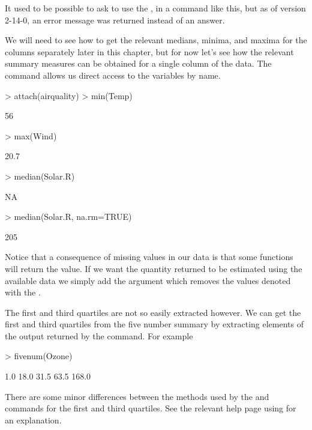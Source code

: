 It used to be possible to ask \R{} to use the , in a command like this, but as of version 2-14-0, an error message was returned instead of an answer. 
 
We will need to see how to get the relevant medians, minima, and maxima for the columns separately later in this chapter, but for now let's see how the relevant summary measures can be obtained for a single column of the  data. The  command allows us direct access to the variables by name. 
\begin{Schunk}
\begin{Sinput}
> attach(airquality) 
> min(Temp) 
\end{Sinput}
\begin{Soutput}
[1] 56
\end{Soutput}
\begin{Sinput}
> max(Wind) 
\end{Sinput}
\begin{Soutput}
[1] 20.7
\end{Soutput}
\begin{Sinput}
> median(Solar.R) 
\end{Sinput}
\begin{Soutput}
[1] NA
\end{Soutput}
\begin{Sinput}
> median(Solar.R, na.rm=TRUE) 
\end{Sinput}
\begin{Soutput}
[1] 205
\end{Soutput}
\end{Schunk}
Notice that a consequence of missing values in our data is that some functions will return the  value. If we want the quantity returned to be estimated using the available data we simply add the argument  which removes the values denoted with the . 
 
The first and third quartiles are not so easily extracted however. We can get the first and third quartiles from the five number summary by extracting elements of the output returned by the  command. For example 
\begin{Schunk}
\begin{Sinput}
> fivenum(Ozone) 
\end{Sinput}
\begin{Soutput}
[1]   1.0  18.0  31.5  63.5 168.0
\end{Soutput}
\end{Schunk}
There are some minor differences between the methods used by the  and  commands for the first and third quartiles. See the relevant help page using  for an explanation. 
 
